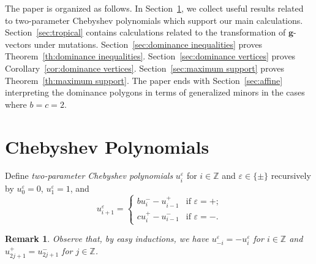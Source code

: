\documentclass{amsart}
\newtheorem{remark}[theorem]{Remark}
\numberwithin{theorem}{section}
\newcommand{\bfg}{\boldsymbol{g}}
\newcommand{\ZZ}{\mathbb{Z}}
\begin{document}
The paper is organized as follows.
In Section~\ref{sec:chebyshev}, we collect useful results related to two-parameter Chebyshev polynomials which support our main calculations.
Section~\ref{sec:tropical} contains calculations related to the transformation of $\bfg$-vectors under mutations.
Section~\ref{sec:dominance inequalities} proves Theorem~\ref{th:dominance inequalities}.
Section~\ref{sec:dominance vertices} proves Corollary~\ref{cor:dominance vertices}.
Section~\ref{sec:maximum support} proves Theorem~\ref{th:maximum support}.
The paper ends with Section~\ref{sec:affine} interpreting the dominance polygons in terms of generalized minors in the cases where $b=c=2$.


\section{Chebyshev Polynomials}
  \label{sec:chebyshev}
  Define \emph{two-parameter Chebyshev polynomials} $u_i^\varepsilon$ for $i\in\ZZ$ and $\varepsilon\in\{\pm\}$ recursively by $u_0^\varepsilon=0$, $u_1^\varepsilon=1$, and
  \[u_{i+1}^\varepsilon=\begin{cases} bu_i^- -u_{i-1}^+ & \text{if $\varepsilon=+$;}\\ cu_i^+-u_{i-1}^- & \text{if $\varepsilon=-$.} \end{cases}\]
  \begin{remark}
    \label{rem:equivalences}
    Observe that, by easy inductions, we have $u_{-i}^\varepsilon=-u_i^\varepsilon$ for $i\in\ZZ$ and $u_{2j+1}^+=u_{2j+1}^-$ for $j\in\ZZ$.
  \end{remark}
\end{document}
